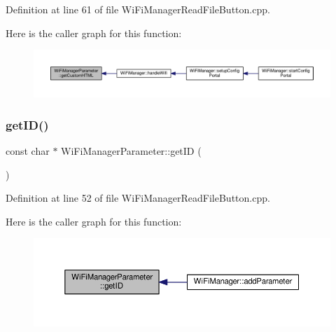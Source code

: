 Definition at line 61 of file Wi\+Fi\+Manager\+Read\+File\+Button.\+cpp.

Here is the caller graph for this function\+:
\nopagebreak
\begin{figure}[H]
\begin{center}
\leavevmode
\includegraphics[width=350pt]{class_wi_fi_manager_parameter_a596273c189eb40107500cee3ad31b13b_icgraph}
\end{center}
\end{figure}
\mbox{\label{class_wi_fi_manager_parameter_af57919615418fff788310ba9cc2664d8}} 
\subsubsection{\texorpdfstring{get\+I\+D()}{getID()}}
{\footnotesize\ttfamily const char $\ast$ Wi\+Fi\+Manager\+Parameter\+::get\+ID (\begin{DoxyParamCaption}{ }\end{DoxyParamCaption})}



Definition at line 52 of file Wi\+Fi\+Manager\+Read\+File\+Button.\+cpp.

Here is the caller graph for this function\+:
\nopagebreak
\begin{figure}[H]
\begin{center}
\leavevmode
\includegraphics[width=350pt]{class_wi_fi_manager_parameter_af57919615418fff788310ba9cc2664d8_icgraph}
\end{center}
\end{figure}
\mbox{\label{class_wi_fi_manager_parameter_a69124c6f46876d1ede54177c692e3382}} 
